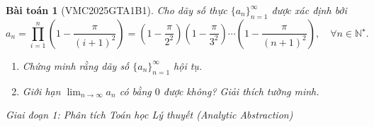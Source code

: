 \documentclass{article}
\newtheorem{baitoan}{Bài toán}
\begin{document}
\begin{baitoan}[VMC2025GTA1B1]
Cho dãy số thực $\{a_n\}_{n=1}^\infty$ được xác định bởi
\begin{equation}
    a_n = \prod_{i=1}^n \left(1 - \frac{\pi}{(i + 1)^2}\right) = \left(1 - \frac{\pi}{2^2}\right)\left(1 - \frac{\pi}{3^2}\right)\cdots\left(1 - \frac{\pi}{(n + 1)^2}\right), \quad \forall n\in\mathbb{N}^\star.
\end{equation}
\begin{enumerate}
    \item[(a)] Chứng minh rằng dãy số $\{a_n\}_{n=1}^\infty$ hội tụ.
    \item[(b)] Giới hạn $\lim_{n\to\infty} a_n$ có bằng $0$ được không? Giải thích tường minh.
\end{enumerate}
\end{baitoan}

\vspace{0.5em}\noindent\emph{Giai đoạn 1: Phân tích Toán học Lý thuyết (Analytic Abstraction)}
\end{document}
